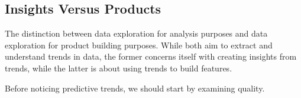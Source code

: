 










































\subsection*{Insights Versus Products}
The distinction between data exploration for analysis purposes
and data exploration for product building purposes. While both
aim to extract and understand trends in data, the former concerns
itself with creating insights from trends, while the latter is
about using trends to build features.

Before noticing predictive trends, we should start by examining
quality.




